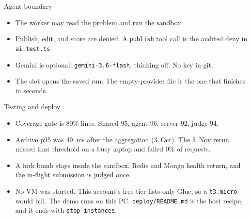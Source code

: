 \documentclass[aspectratio=169]{beamer}
\begin{document}
\begin{frame}{Agent boundary}
\begin{itemize}
\item The worker may read the problem and run the sandbox.
\item Publish, edit, and score are denied. A \texttt{publish} tool call is the audited deny in \texttt{ai.test.ts}.
\item Gemini is optional: \texttt{gemini-3.6-flash}, thinking off. No key in git.
\item The slot opens the saved run. The empty-provider file is the one that finishes in seconds.
\end{itemize}
\end{frame}

\begin{frame}{Testing and deploy}
\begin{itemize}
\item Coverage gate is 80\% lines. Shared 95, agent 96, server 92, judge 94.
\item Archive p95 was 49~ms after the aggregation (3~Oct). The 5~Nov rerun missed that threshold on a busy laptop and failed 0\% of requests.
\item A fork bomb stays inside the sandbox. Redis and Mongo health return, and the in-flight submission is judged once.
\item No VM was started. This account's free tier lists only Glue, so a \texttt{t3.micro} would bill. The demo runs on this PC. \texttt{deploy/README.md} is the host recipe, and it ends with \texttt{stop-instances}.
\end{itemize}
\end{frame}
\end{document}
